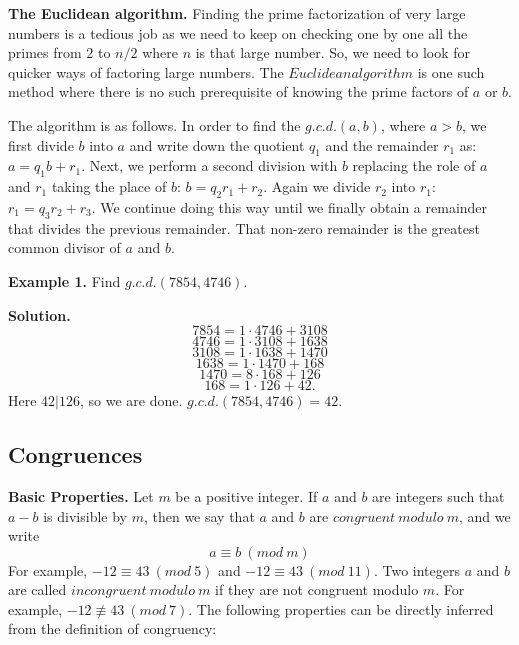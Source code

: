 \documentclass[12pt]{article}
\begin{document}
\textbf{The Euclidean algorithm.} Finding the prime factorization of very large numbers is a tedious job as we need to keep on checking one by one all the primes from $2$ to $n/2$ where $n$ is that large number. So, we need to look for quicker ways of factoring large numbers. The $Euclidean algorithm$ is one such method where there is no such prerequisite of knowing the prime factors of $a$ or $b$. \par
The algorithm is as follows. In order to find the $g.c.d.(a,b)$, where $a>b$, we first divide $b$ into $a$ and write down the quotient $q_1$ and the remainder $r_1$ as: $a=q_1 b+r_1$. Next, we perform a second division with $b$ replacing the role of $a$ and $r_1$ taking the place of $b$: $b=q_2 r_1+r_2$. Again we divide $r_2$ into $r_1$: $r_1=q_3 r_2+r_3$. We continue doing this way until we finally obtain a remainder that divides the previous remainder. That non-zero remainder is the greatest common divisor of $a$ and $b$.


\textbf{Example 1.} Find $g.c.d.(7854, 4746)$.


\textbf{Solution.} $$7854= 1 \cdot 4746+3108$$
$$4746= 1 \cdot 3108 + 1638$$
$$3108= 1 \cdot 1638 + 1470$$
$$1638= 1 \cdot 1470 + 168$$
$$1470= 8 \cdot 168 + 126$$
$$168= 1 \cdot 126 + 42.$$
Here $42|126$, so we are done. $g.c.d.(7854, 4746)=42$.

         \subsection{Congruences}
\textbf{Basic Properties.} Let $m$ be a positive integer. If $a$ and $b$ are integers such that $a-b$ is divisible by $m$, then we say that $a$ and $b$ are $congruent \:  modulo \: m$, and we write $$a \equiv b\:(mod \: m)$$ For example, $ -12 \equiv 43 \:(mod \: 5)$ and $-12 \equiv 43 \:(mod \: 11)$. Two integers $a$ and $b$ are called $incongruent \: modulo \: m$ if they are not congruent modulo $m$. For example, $-12 \not\equiv 43 \:(mod \: 7)$. The following properties can be directly inferred from the definition of congruency:
\end{document}
